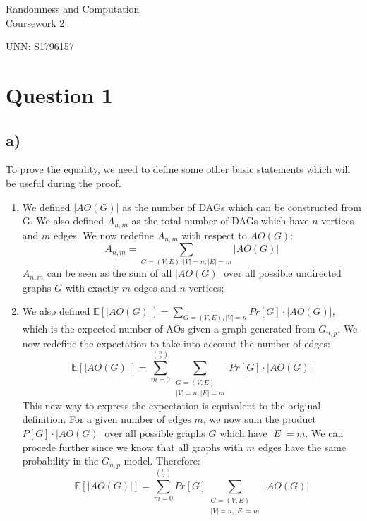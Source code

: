 \documentclass[11pt,a4paper]{article}
\author{UNN: S1796157}
\begin{document}
\begin{center}
{\Large Randomness and Computation}\\
{\Large Coursework 2}
\smallskip

{UNN: S1796157}
\end{center}

\section*{Question 1}

\subsection*{a)}
To prove the equality, we need to define some other basic statements which will be useful during the proof.
\begin{enumerate}
\item We defined $|AO(G)|$ as the number of DAGs which can be constructed from G. We also defined $A_{n,m}$ as
the total number of DAGs which have $n$ vertices and $m$ edges. We now redefine $A_{n,m}$ with respect to $AO(G)$:
\begin{equation}
A_{n,m} = \sum_{G=(V,E), |V|=n, |E|=m} |AO(G)|
\label{1a_conclusion}
\end{equation} 
$A_{n,m}$ can be seen as the sum of all $|AO(G)|$ over all possible undirected
graphs $G$ with exactly $m$ edges and $n$ vertices;
\item We also defined $\mathbb{E}[|AO(G)|] = \sum_{G=(V,E), |V|=n} Pr[G]\cdot |AO(G)|$, which is the expected
number of AOs given a graph generated from $G_{n,p}$. We now redefine the expectation to take into account
the number of edges:
\begin{equation}
\mathbb{E}[|AO(G)|] = \sum_{m=0}^{\binom{n}{2}}\sum_{\substack{G=(V,E)\\|V|=n,|E|=m}} Pr[G]\cdot |AO(G)|
\end{equation} 
This new way to express the expectation is equivalent to the original definition. For a given number of edges $m$,
we now sum the product $P[G]\cdot |AO(G)|$ over all possible graphs $G$ which have $|E|=m$. We can procede
further since we know that all graphs with $m$ edges have the same probability in the $G_{n,p}$ model. 
Therefore:
\begin{equation}
\mathbb{E}[|AO(G)|] = \sum_{m=0}^{\binom{n}{2}}Pr[G]\sum_{\substack{G=(V,E)\\|V|=n,|E|=m}} |AO(G)|
\end{equation} 
\end{enumerate}
\end{document}
